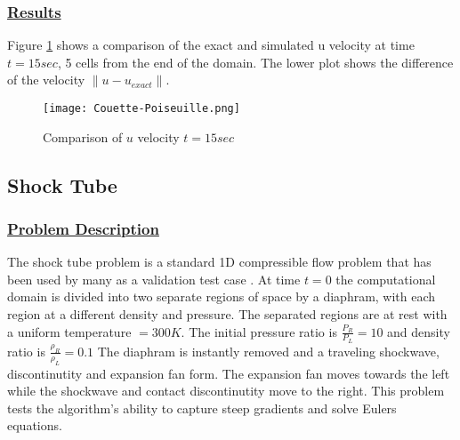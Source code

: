 \subsubsection*{\underline{Results}}
Figure \ref{fig:CombinedPoiseuille} shows a comparison of the exact and simulated u
velocity at time $t = 15sec$, 5 cells from the end of the domain.  The lower
plot shows the difference of the velocity $\|u - u_{exact}\|$.
%
\begin{figure}
  \texttt{[image: Couette-Poiseuille.png]}
  \caption{ Comparison of $u$ velocity $t = 15sec$}
  \label{fig:CombinedPoiseuille}
  \end{figure}
\newpage
%
\subsection*{\center Shock Tube}
\subsubsection*{\underline{Problem Description}}
The shock tube problem is a standard 1D compressible flow problem that
has been used by many as a validation test case \cite{ref:laney, ref:sod, ref:toro}.
At time $t=0$ the computational domain is divided into two separate regions of
space by a diaphram, with each region at a different density and pressure.
The separated regions are at rest with a uniform temperature $=300K$.
The initial pressure ratio is $\frac{P_R}{P_L}  = 10$ and density ratio
is $\frac{\rho_R}{\rho_L} = 0.1$  The diaphram is instantly removed and a
traveling shockwave, discontinutity and expansion fan form.  The expansion
fan moves towards the left while the shockwave and contact discontinutity
move to the right.  This problem tests the algorithm's ability to capture
steep gradients and solve Eulers equations.
%
